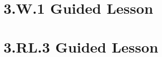 \documentclass[a4paper,12pt]{article}
\begin{document}
% 
% 
% 
% 

\newpage
\section{3.W.1 Guided Lesson}


% 

% 

% 

\newpage
\section{3.RL.3 Guided Lesson}


% 
\end{document}
